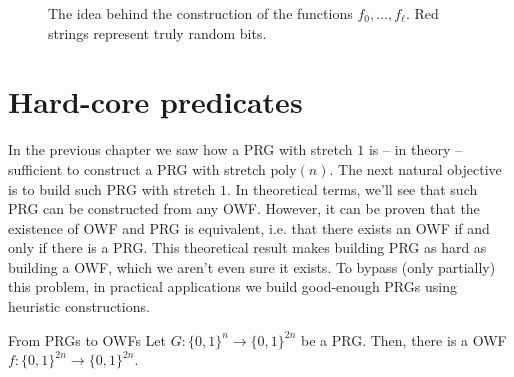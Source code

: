\documentclass[a4paper, 12pt]{report}
\begin{document}
\begin{figure}[H]

        \caption{The idea behind the construction of the functions $f_0, \ldots, f_\ell$. Red strings represent truly random bits.}
        \label{prg_stretching_1}
    \end{figure}

    \newpage

    \section{Hard-core predicates}

    In the previous chapter we saw how a PRG with stretch $1$ is -- in theory -- sufficient to construct a PRG with stretch $\mathrm{poly}(n)$. The next natural objective is to build such PRG with stretch $1$.
    In theoretical terms, we'll see that such PRG can be constructed from any OWF. However, it can be proven that the existence of OWF and PRG is equivalent, i.e. that there exists an OWF if and only if there is a PRG. This theoretical result makes building PRG as hard as building a OWF, which we aren't even sure it exists. To bypass (only partially) this problem, in practical applications we build good-enough PRGs using heuristic constructions.

    \begin{framedthm}{From PRGs to OWFs}
        Let $G : \{0,1\}^n \to \{0,1\}^{2n}$ be a PRG. Then, there is a OWF $f : \{0,1\}^{2n} \to \{0,1\}^{2n}$.
    \end{framedthm}
\end{document}
